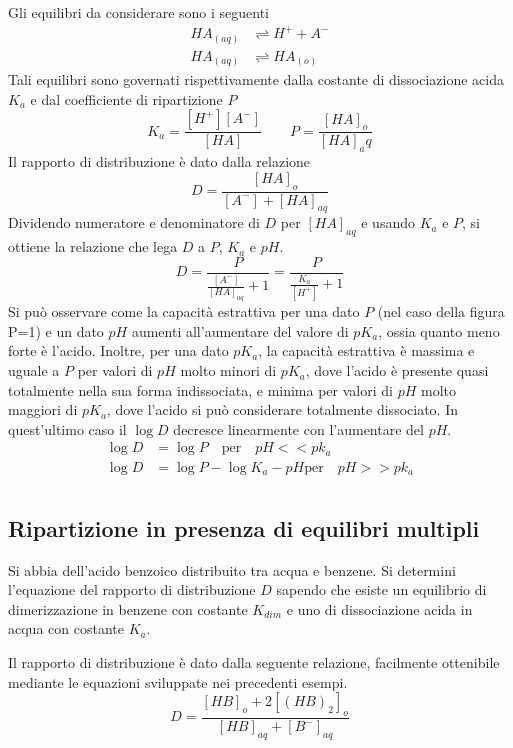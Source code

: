 Gli equilibri da considerare sono i seguenti
\begin{align*}
HA_{(aq)} & \rightleftharpoons H^+ + A^-\\
HA_{(aq)} & \rightleftharpoons HA_{(o)}
\end{align*}
Tali equilibri sono governati rispettivamente dalla costante di dissociazione acida $K_a$ e dal coefficiente di ripartizione $P$
\[
K_a = \frac{[H^+] [A^-]}{[HA]} \qquad P = \frac{[HA]_o}{[HA]_aq}
\]
Il rapporto di distribuzione è dato dalla relazione
\[
D = \frac{[HA]_o}{[A^-] + [HA]_{aq}}
\]
Dividendo numeratore e denominatore di $D$ per $[HA]_{aq}$ e usando $K_a$ e $P$, si ottiene la relazione che lega $D$ a $P$, $K_a$ e $pH$.
\[
D = \frac{P}{\frac{[A^-]}{[HA]_{aq}} + 1} = \frac{P}{\frac{K_a}{[H^+]} + 1}
\]
Si può osservare come la capacità estrattiva per una dato $P$ (nel caso della figura P=1) e un dato $pH$ aumenti all'aumentare del valore di $pK_a$, ossia quanto meno forte è l'acido. Inoltre, per una dato $pK_a$, la capacità estrattiva è massima e uguale a $P$ per valori di $pH$ molto minori di $pK_a$, dove l'acido è presente quasi totalmente nella sua forma indissociata, e minima per valori di $pH$ molto maggiori di $pK_a$, dove l'acido si può considerare totalmente dissociato. In quest'ultimo caso il $\log D$ decresce linearmente con l'aumentare del $pH$.
\begin{align*}
\log D & = \log P \quad \text{per} \quad pH << pk_a\\
\log D & = \log P - \log K_a - pH \text{per} \quad pH >> pk_a\\
\end{align*}


\subsection{Ripartizione in presenza di equilibri multipli}
Si abbia dell'acido benzoico distribuito tra acqua e benzene. Si determini l'equazione del rapporto di distribuzione $D$ sapendo che esiste un equilibrio di dimerizzazione in benzene con costante $K_{dim}$ e uno di dissociazione acida in acqua con costante $K_a$.

Il rapporto di distribuzione è dato dalla seguente relazione, facilmente ottenibile mediante le equazioni sviluppate nei precedenti esempi.
\[
D = \frac{[HB]_o + 2 [(HB)_2]_o}{[HB]_{aq} + [B^-]_{aq}}
\]

